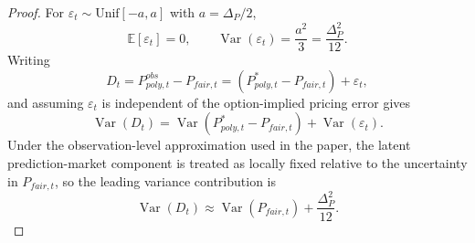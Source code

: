 \documentclass[11pt]{article}
\numberwithin{equation}{section}
\theoremstyle{plain}
\begin{document}
\begin{proof}
For $\varepsilon_t\sim \mathrm{Unif}[-a,a]$ with $a=\Delta_P/2$,
\[
\mathbb{E}[\varepsilon_t]=0,
\qquad
\operatorname{Var}(\varepsilon_t)=\frac{a^2}{3}=\frac{\Delta_P^2}{12}.
\]
Writing
\[
D_t=P_{poly,t}^{obs}-P_{fair,t}
=
\left(P_{poly,t}^{\ast}-P_{fair,t}\right)+\varepsilon_t,
\]
and assuming $\varepsilon_t$ is independent of the option-implied pricing error gives
\[
\operatorname{Var}(D_t)
=
\operatorname{Var}(P_{poly,t}^{\ast}-P_{fair,t})+\operatorname{Var}(\varepsilon_t).
\]
Under the observation-level approximation used in the paper, the latent prediction-market component is treated as locally fixed relative to the uncertainty in $P_{fair,t}$, so the leading variance contribution is
\[
\operatorname{Var}(D_t)\approx \operatorname{Var}(P_{fair,t})+\frac{\Delta_P^2}{12}.
\]
\end{proof}



\end{document}

